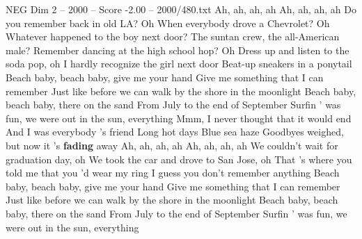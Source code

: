 \begin{textsample}{NEG Dim 2 – 2000 – Score -2.00 – 2000/480.txt}  \label{ex:f2_neg_040}
Ah, ah, ah, ah Ah, ah, ah, ah Do you remember back in old LA?
Oh When everybody drove a Chevrolet?
Oh Whatever happened to the boy next door?
The suntan crew, the all-American male?
Remember dancing at the high school hop?
Oh Dress up and listen to the soda pop, oh I hardly recognize the girl next door Beat-up sneakers in a ponytail Beach baby, beach baby, give me your hand Give me something that I can remember Just like before we can walk by the shore in the moonlight Beach baby, beach baby, there on the sand From July to the end of September Surfin ' was fun, we were out in the sun, everything Mmm, I never thought that it would end And I was everybody 's friend Long hot days Blue sea haze Goodbyes weighed, but now it 's \textbf{fading} away Ah, ah, ah, ah Ah, ah, ah, ah We couldn't wait for graduation day, oh We took the car and drove to San Jose, oh That 's where you told me that you 'd wear my ring I guess you don't remember anything Beach baby, beach baby, give me your hand Give me something that I can remember Just like before we can walk by the shore in the moonlight Beach baby, beach baby, there on the sand From July to the end of September Surfin ' was fun, we were out in the sun, everything

\end{textsample}
